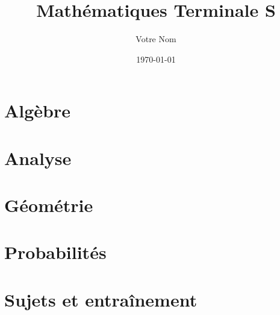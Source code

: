 \documentclass[
11pt,
a5paper,
oneside,
openany
]{book}
\title{Mathématiques Terminale S}
\author{Votre Nom}
\date{\today}
\begin{document}
	
	\frontmatter
	
	
	
	
	
	
	\tableofcontents
	
	\mainmatter
	
	\part{Algèbre}

	
	

	

	\part{Analyse}

	
	
	
	
	
	
	
	
	
	
	\part{Géométrie}

	
	
	
	
	
	\part{Probabilités}

	
	
	
	
	

	\part{Sujets et entraînement}

	
	
	
	
	\appendix
	
\end{document}
